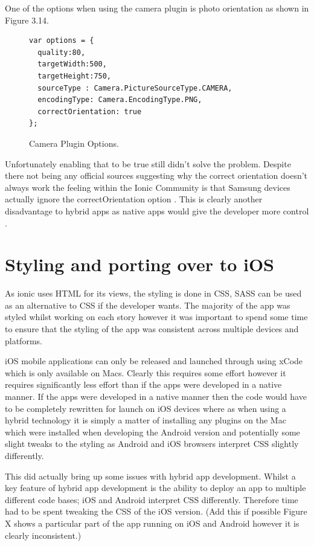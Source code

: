 One of the options when using the camera plugin is photo orientation as shown in Figure 3.14. 
\begin{center}
\begin{figure}[H]
\begin{verbatim}
var options = {
  quality:80,
  targetWidth:500,
  targetHeight:750,
  sourceType : Camera.PictureSourceType.CAMERA,
  encodingType: Camera.EncodingType.PNG,
  correctOrientation: true
};
\end{verbatim}
\caption{Camera Plugin Options.}
\end{figure}
\end{center}
Unfortunately enabling that to be true still didn't solve the problem. Despite there not being any official sources suggesting why the correct orientation doesn't always work the feeling within the Ionic Community is that Samsung devices actually ignore the correctOrientation option \cite{ioniccom1}. This is clearly another disadvantage to hybrid apps as native apps would give the developer more control \cite{androidcamera}.
\section{Styling and porting over to iOS}
As ionic uses HTML for its views, the styling is done in CSS, SASS can be used as an alternative to CSS if the developer wants. The majority of the app was styled whilst working on each story however it was important to spend some time to ensure that the styling of the app was consistent across multiple devices and platforms.

iOS mobile applications can only be released and launched through using xCode which is only available on Macs. Clearly this requires some effort however it requires significantly less effort than if the apps were developed in a native manner. If the apps were developed in a native manner then the code would have to be completely rewritten for launch on iOS devices where as when using a hybrid technology it is simply a matter of installing any plugins on the Mac which were installed when developing the Android version and potentially some slight tweaks to the styling as Android and iOS browsers interpret CSS slightly differently. 

This did actually bring up some issues with hybrid app development. Whilst a key feature of hybrid app development is the ability to deploy an app to multiple different code bases; iOS and Android interpret CSS differently. Therefore time had to be spent tweaking the CSS of the iOS version. (Add this if possible Figure X shows a particular part of the app running on iOS and Android however it is clearly inconsistent.)

